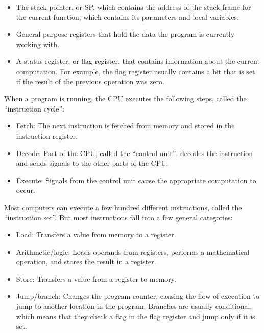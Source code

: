 \documentclass[12pt]{book}
\begin{document}
{\begin{itemize}
\item The stack pointer, or SP, which contains the address of the
  stack frame for the current function, which contains its parameters
  and local variables.

\item General-purpose registers that hold the data the program is
  currently working with.

\item A status register, or flag register, that contains information
  about the current computation.  For example, the flag register
  usually contains a bit that is set if the result of the previous
  operation was zero.

\end{itemize}

When a program is running, the CPU executes the following steps,
called the ``instruction cycle'':

\begin{itemize}

\item Fetch: The next instruction is fetched from memory and stored
in the instruction register.

\item Decode: Part of the CPU, called the ``control unit'', decodes
the instruction and sends signals to the other parts of
the CPU.

\item Execute: Signals from the control unit cause the appropriate
  computation to occur.

\end{itemize}

Most computers can execute a few hundred different instructions,
called the ``instruction set''.  But most instructions fall
into a few general categories:

\begin{itemize}

\item Load: Transfers a value from memory to a register.

\item Arithmetic/logic: Loads operands from registers, performs
a mathematical operation, and stores the result in a register.

\item Store: Transfers a value from a register to memory.

\item Jump/branch: Changes the program counter, causing the flow
of execution to jump to another location in the program.  Branches
are usually conditional, which means that they check a flag
in the flag register and jump only if it is set.


\end{itemize}}
\end{document}
